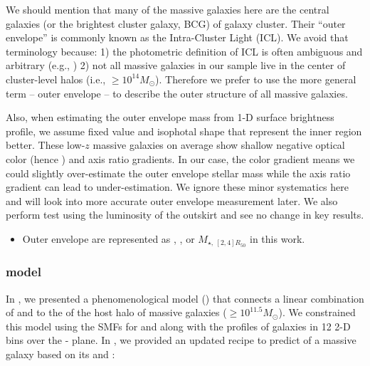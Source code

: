 \documentclass[fleqn,usenatbib,useAMS,english]{mnras}
\begin{document}
    We should mention that many of the massive galaxies here are the central galaxies
    (or the brightest cluster galaxy, BCG) of galaxy cluster. 
    Their ``outer envelope'' is commonly known as the Intra-Cluster Light (ICL).
    We avoid that terminology because:
    1) the photometric definition of ICL is often ambiguous and arbitrary (e.g.,
    \citealt{Kluge2021})
    2) not all massive galaxies in our sample live in the
    center of cluster-level halos (i.e., \mvir{}$\geq 10^{14} M_{\odot}$).
    Therefore we prefer to use the more general term -- outer envelope -- to describe the
    outer structure of all massive galaxies.
    
    Also, when estimating the outer envelope mass from 1-D surface brightness profile,
    we assume fixed \mlratio{} value and isophotal shape that represent the inner region
    better.
    These low-$z$ massive galaxies on average show shallow negative optical color
    (hence \mlratio{}) and axis ratio gradients. 
    In our case, the color gradient means we could slightly over-estimate the outer envelope
    stellar mass while the axis ratio gradient can lead to under-estimation.
    We ignore these minor systematics here and will look into more accurate outer envelope 
    \mstar{} measurement later.
    We also perform \topn{} test using the luminosity of the outskirt and see no 
    change in key results.

    \begin{itemize}
        \item Outer envelope \mstar{} are represented as , , or
        $M_{\star,\ [2,4]R_{50}}$ in this work.

    \end{itemize}

\subsubsection{\asap{} model}
    \label{sec:masap}

    In \citet{Huang2020}, we presented a phenomenological model (\asap{}) that connects a linear
    combination of  and  to the \mvir{} of the host halo of massive galaxies
    ($\geq 10^{11.5} M_{\odot}$).
    We constrained this model using the SMFs for  and  along with the
    \dsigma{} profiles of galaxies in 12 2-D bins over the - plane.
    In \citet{Ardila2021}, we provided an updated \asap{} recipe to predict \mvir{} of a
    massive galaxy based on its  and :
\end{document}
